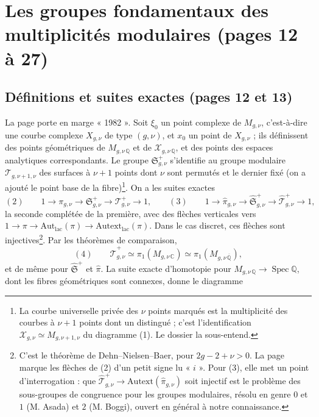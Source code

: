 \documentclass[11pt,a4paper]{article}
\begin{document}
\section*{Les groupes fondamentaux des multiplicités modulaires (pages 12 à 27)}

\subsection*{Définitions et suites exactes (pages 12 et 13)}

La page porte en marge « 1982 ». Soit $\xi_0$ un point complexe de
$M_{g,\nu}$, c'est-à-dire une courbe complexe $X_{g,\nu}$ de type $(g,\nu)$,
et $x_0$ un point de $X_{g,\nu}$ ; ils définissent des points géométriques de
$M_{g,\nu\,\mathbb{Q}}$ et de $\mathcal{X}_{g,\nu\,\mathbb{Q}}$, et des points
des espaces analytiques correspondants. Le groupe $\mathfrak{S}^{+}_{g,\nu}$
s'identifie au groupe modulaire $\mathcal{T}_{g,\nu+1,\nu}$ des surfaces à
$\nu + 1$ points dont $\nu$ sont permutés et le dernier fixé (on a ajouté le
point base de la fibre)\footnote{La courbe universelle privée des $\nu$ points
marqués est la multiplicité des courbes à $\nu + 1$ points dont un distingué ;
c'est l'identification $\mathcal{X}_{g,\nu} \simeq M_{g,\nu+1,\nu}$ du
diagramme (1). Le dossier la sous-entend.}. On a les suites exactes
\[
(2)\qquad 1 \to \pi_{g,\nu} \to \mathfrak{S}^{+}_{g,\nu} \to \mathcal{T}^{+}_{g,\nu} \to 1,
\qquad
(3)\qquad 1 \to \hat\pi_{g,\nu} \to \hat{\mathfrak{S}}^{+}_{g,\nu} \to \hat{\mathcal{T}}^{+}_{g,\nu} \to 1,
\]
la seconde complétée de la première, avec des flèches verticales vers
$1 \to \pi \to \mathrm{Aut}_{\mathrm{lac}}(\pi) \to \mathrm{Autext}_{\mathrm{lac}}(\pi)$.
Dans le cas discret, ces flèches sont injectives\footnote{C'est le théorème de
Dehn–Nielsen–Baer, pour $2g - 2 + \nu > 0$. La page marque les flèches de (2)
d'un petit signe lu « $i$ ». Pour (3), elle met un point d'interrogation : que
$\hat{\mathcal{T}}^{+}_{g,\nu} \to \mathrm{Autext}(\hat\pi_{g,\nu})$ soit
injectif est le problème des sous-groupes de congruence pour les groupes
modulaires, résolu en genre $0$ et $1$ (M. Asada) et $2$ (M. Boggi), ouvert
en général à notre connaissance.}. Par les théorèmes de comparaison,
\[
(4)\qquad \hat{\mathcal{T}}^{+}_{g,\nu} \simeq \pi_1(M_{g,\nu\,\mathbb{C}}) \simeq \pi_1(M_{g,\nu\,\overline{\mathbb{Q}}}),
\]
et de même pour $\hat{\mathfrak{S}}^{+}$ et $\hat\pi$. La suite exacte
d'homotopie pour $M_{g,\nu\,\mathbb{Q}} \to \operatorname{Spec}\mathbb{Q}$,
dont les fibres géométriques sont connexes, donne le diagramme
\end{document}
